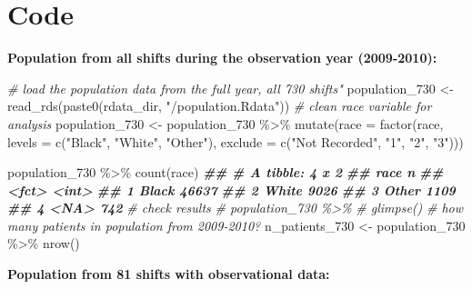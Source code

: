 \documentclass[
]{article}
\newenvironment{Shaded}{\begin{snugshade}}{\end{snugshade}}
\newcommand{\AttributeTok}[1]{\textcolor[rgb]{0.77,0.63,0.00}{#1}}
\newcommand{\CommentTok}[1]{\textcolor[rgb]{0.56,0.35,0.01}{\textit{#1}}}
\newcommand{\DocumentationTok}[1]{\textcolor[rgb]{0.56,0.35,0.01}{\textbf{\textit{#1}}}}
\newcommand{\FunctionTok}[1]{\textcolor[rgb]{0.00,0.00,0.00}{#1}}
\newcommand{\NormalTok}[1]{#1}
\newcommand{\OtherTok}[1]{\textcolor[rgb]{0.56,0.35,0.01}{#1}}
\newcommand{\SpecialCharTok}[1]{\textcolor[rgb]{0.00,0.00,0.00}{#1}}
\newcommand{\StringTok}[1]{\textcolor[rgb]{0.31,0.60,0.02}{#1}}
\begin{document}
\hypertarget{code}{%
\section{Code}\label{code}}

\textbf{Population from all shifts during the observation year
(2009-2010):}

\begin{Shaded}
\begin{Highlighting}[]
\CommentTok{\# load the population data from the full year, all 730 shifts"}
\NormalTok{population\_730 }\OtherTok{\textless{}{-}} \FunctionTok{read\_rds}\NormalTok{(}\FunctionTok{paste0}\NormalTok{(rdata\_dir, }\StringTok{"/population.Rdata"}\NormalTok{))}
\CommentTok{\# clean race variable for analysis}
\NormalTok{population\_730 }\OtherTok{\textless{}{-}}\NormalTok{ population\_730 }\SpecialCharTok{\%\textgreater{}\%}
  \FunctionTok{mutate}\NormalTok{(}\AttributeTok{race =} \FunctionTok{factor}\NormalTok{(race,}
              \AttributeTok{levels =} \FunctionTok{c}\NormalTok{(}\StringTok{"Black"}\NormalTok{,}
                         \StringTok{"White"}\NormalTok{,}
                         \StringTok{"Other"}\NormalTok{),}
              \AttributeTok{exclude =} \FunctionTok{c}\NormalTok{(}\StringTok{"Not Recorded"}\NormalTok{, }\StringTok{"1"}\NormalTok{, }\StringTok{"2"}\NormalTok{, }\StringTok{"3"}\NormalTok{)))}

\NormalTok{population\_730 }\SpecialCharTok{\%\textgreater{}\%} 
    \FunctionTok{count}\NormalTok{(race)}
\DocumentationTok{\#\# \# A tibble: 4 x 2}
\DocumentationTok{\#\#   race      n}
\DocumentationTok{\#\#   \textless{}fct\textgreater{} \textless{}int\textgreater{}}
\DocumentationTok{\#\# 1 Black 46637}
\DocumentationTok{\#\# 2 White  9026}
\DocumentationTok{\#\# 3 Other  1109}
\DocumentationTok{\#\# 4 \textless{}NA\textgreater{}    742}
\CommentTok{\# check results}
\CommentTok{\# population\_730 \%\textgreater{}\% }
  \CommentTok{\# glimpse()}
\CommentTok{\# how many patients in population from 2009{-}2010?}
\NormalTok{n\_patients\_730 }\OtherTok{\textless{}{-}}\NormalTok{ population\_730 }\SpecialCharTok{\%\textgreater{}\%}
  \FunctionTok{nrow}\NormalTok{()}
\end{Highlighting}
\end{Shaded}

\textbf{Population from 81 shifts with observational data:}
\end{document}
